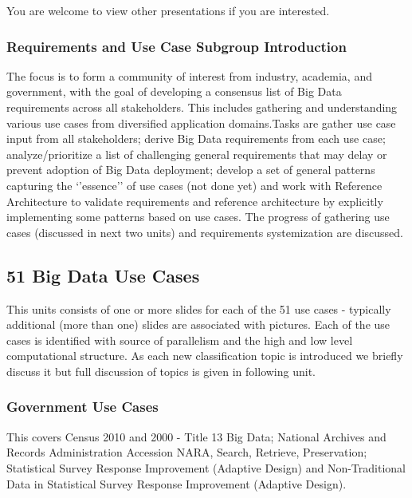 You are welcome to view other presentations if you are interested.

\subsubsection{Requirements and Use Case Subgroup
Introduction}\label{requirements-and-use-case-subgroup-introduction}

The focus is to form a community of interest from industry, academia,
and government, with the goal of developing a consensus list of Big Data
requirements across all stakeholders. This includes gathering and
understanding various use cases from diversified application
domains.Tasks are gather use case input from all stakeholders; derive
Big Data requirements from each use case; analyze/prioritize a list of
challenging general requirements that may delay or prevent adoption of
Big Data deployment; develop a set of general patterns capturing the
`'essence'' of use cases (not done yet) and work with Reference
Architecture to validate requirements and reference architecture by
explicitly implementing some patterns based on use cases. The progress
of gathering use cases (discussed in next two units) and requirements
systemization are discussed.




\subsection{51 Big Data Use Cases}\label{big-data-use-cases}

This units consists of one or more slides for each of the 51 use cases -
typically additional (more than one) slides are associated with
pictures. Each of the use cases is identified with source of parallelism
and the high and low level computational structure. As each new
classification topic is introduced we briefly discuss it but full
discussion of topics is given in following unit.




\subsubsection{Government Use Cases}\label{government-use-cases}

This covers Census 2010 and 2000 - Title 13 Big Data; National Archives
and Records Administration Accession NARA, Search, Retrieve,
Preservation; Statistical Survey Response Improvement (Adaptive Design)
and Non-Traditional Data in Statistical Survey Response Improvement
(Adaptive Design).



